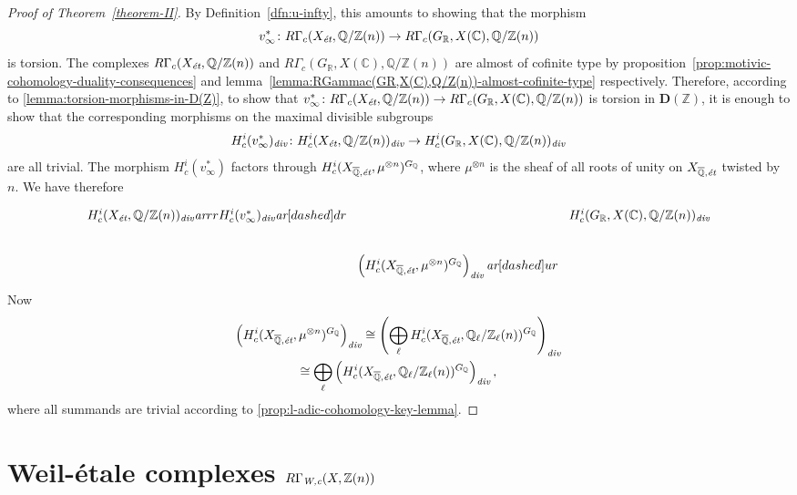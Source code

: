 \documentclass[leqno,12pt]{article}
\theoremstyle{plain}
\theoremstyle{definition}
\newcommand{\ZZ}{\mathbb{Z}}
\newcommand{\QQ}{\mathbb{Q}}
\newcommand{\RR}{\mathbb{R}}
\newcommand{\CC}{\mathbb{C}}
\renewcommand{\div}{\text{\it div}}
\newcommand{\Wc}{\text{\it W,c}}
\newcommand{\et}{\text{\it \'{e}t}}
\newcommand{\ar}{\text{\it ar}}
\begin{document}
\begin{proof}[Proof of Theorem~\ref{theorem-II}]
  By Definition~\ref{dfn:u-infty}, this amounts to showing that the morphism
  $$v_\infty^*\colon R\Gamma_c (X_\et, \QQ/\ZZ (n)) \to R\Gamma_c (G_\RR, X (\CC), \QQ/\ZZ (n))$$
  is torsion. The complexes $R\Gamma_c (X_\et, \QQ/\ZZ (n))$ and
  $R\Gamma_c (G_\RR, X (\CC), \QQ/\ZZ (n))$ are almost of cofinite type by
  proposition~\ref{prop:motivic-cohomology-duality-consequences} and
  lemma~\ref{lemma:RGammac(GR,X(C),Q/Z(n))-almost-cofinite-type} respectively.
  Therefore, according to \ref{lemma:torsion-morphisms-in-D(Z)}, to show that
  $v^*_\infty\colon R\Gamma_c (X_\et, \QQ/\ZZ (n)) \to R\Gamma_c (G_\RR, X
  (\CC), \QQ/\ZZ (n))$ is torsion in $\mathbf{D} (\ZZ)$, it is enough to show
  that the corresponding morphisms on the maximal divisible subgroups
  \[ H^i_c (v^*_\infty)_\div\colon H^i_c (X_\et, \QQ/\ZZ (n))_\div \to
     H^i_c (G_\RR, X (\CC), \QQ/\ZZ (n))_\div \]
  are all trivial. The morphism $H^i_c (v^*_\infty)$ factors through
  $H^i_c (X_{\overline{\QQ}, \text{\it \'{e}t}}, \mu^{\otimes n})^{G_\QQ}$, where
  $\mu^{\otimes n}$ is the sheaf of all roots of unity on
  $X_{\overline{\QQ}, \text{\it \'{e}t}}$ twisted by $n$.
  We have therefore
  \[ \begin{tikzcd}[column sep=0pt]
    H^i_c (X_\et, \QQ/\ZZ (n))_\div\ar{rr}{H^i_c (v^*_\infty)_\div}\ar[dashed]{dr} && H^i_c (G_\RR, X (\CC), \QQ/\ZZ (n))_\div\\
    & \left(H^i_c (X_{\overline{\QQ}, \text{\it \'{e}t}}, \mu^{\otimes n})^{G_\QQ}\right)_\div\ar[dashed]{ur}
  \end{tikzcd} \]
  Now
  \begin{multline*}
    \left(H^i_c (X_{\overline{\QQ}, \text{\it \'{e}t}}, \mu^{\otimes n})^{G_\QQ}\right)_\div \cong
    \left(\bigoplus_\ell H^i_c (X_{\overline{\QQ}, \text{\it \'{e}t}}, \QQ_\ell/\ZZ_\ell (n))^{G_\QQ}\right)_\div \\
    \cong
    \bigoplus_\ell \left(H^i_c (X_{\overline{\QQ}, \text{\it \'{e}t}}, \QQ_\ell/\ZZ_\ell (n))^{G_\QQ}\right)_\div,
  \end{multline*}
  where all summands are trivial according to
  \ref{prop:l-adic-cohomology-key-lemma}.
\end{proof}


\section{Weil-\'{e}tale complexes $R\Gamma_\Wc (X, \ZZ(n))$}
\label{sec:RGamma-Wc}
\end{document}
